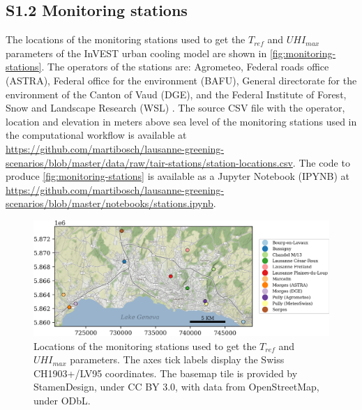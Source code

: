 \documentclass[10pt,letterpaper]{article}
\begin{document}


\subsection*{S1.2 Monitoring stations}
\label{sec:monitoring-stations}

The locations of the monitoring stations used to get the $T_{ref}$ and $UHI_{max}$ parameters of the InVEST urban cooling model are shown in \autoref{fig:monitoring-stations}. The operators of the stations are: Agrometeo, Federal roads office (ASTRA), Federal office for the environment (BAFU), General directorate for the environment of the Canton of Vaud (DGE), and the Federal Institute of Forest, Snow and Landscape Research (WSL) \cite{rebetez2018meteorological}.
The source CSV file with the operator, location and elevation in meters above sea level of the monitoring stations used in the computational workflow is available at \url{https://github.com/martibosch/lausanne-greening-scenarios/blob/master/data/raw/tair-stations/station-locations.csv}.
The code to produce \autoref{fig:monitoring-stations} is available as a Jupyter Notebook (IPYNB) at \url{https://github.com/martibosch/lausanne-greening-scenarios/blob/master/notebooks/stations.ipynb}.

\begin{figure}[H]
  \centering
  \includegraphics[width=.98\textwidth]{figures/monitoring-stations}
  \caption{\label{fig:monitoring-stations} Locations of the monitoring stations used to get the $T_{ref}$ and $UHI_{max}$ parameters. The axes tick labels display the Swiss CH1903+/LV95 coordinates. The basemap tile is provided by StamenDesign, under CC BY 3.0, with data from OpenStreetMap, under ODbL.}
\end{figure}
\end{document}
